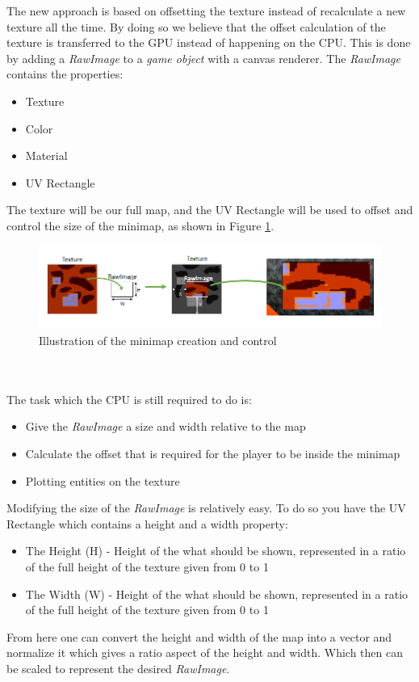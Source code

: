 The new approach is based on offsetting the texture instead of recalculate a new texture all the time.
By doing so we believe that the offset calculation of the texture is transferred to the GPU instead of happening on the CPU.
This is done by adding a \textit{RawImage} to a \textit{game object} with a canvas renderer.
The \textit{RawImage} contains the properties:
\begin{itemize}
\item Texture
\item Color
\item Material
\item UV Rectangle
\end{itemize}
The texture will be our full map, and the UV Rectangle will be used to offset and control the size of the minimap, as shown in Figure \ref{minimap:creation}.
\begin{figure}
    \includegraphics[scale=0.5]{figures/minimap/RawImage.png}
    \caption{Illustration of the minimap creation and control}
    \label{minimap:creation}
\end{figure}
\\\\
The task which the CPU is still required to do is:
\begin{itemize}
\item Give the \textit{RawImage} a size and width relative to the map
\item Calculate the offset that is required for the player to be inside the minimap
\item Plotting entities on the texture
\end{itemize}
Modifying the size of the \textit{RawImage} is relatively easy. 
To do so you have the UV Rectangle which contains a height and a width property:
\begin{itemize}
\item The Height (H) - Height of the what should be shown, represented in a ratio of the full height of the texture given from 0 to 1
\item The Width (W) - Height of the what should be shown, represented in a ratio of the full height of the texture given from 0 to 1
\end{itemize}
From here one can convert the height and width of the map into a vector and normalize it which gives a  ratio aspect of the height and width. Which then can be scaled to represent the desired \textit{RawImage}.

